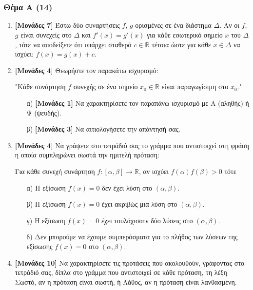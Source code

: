 \documentclass[14pt]{extarticle}
\begin{document}
\part*{}
\section*{Θέμα Α (14)}
  \noindent
  \begin{enumerate}
    \item \textbf{[Μονάδες 7]} Έστω δύο συναρτήσεις $f$, $g$ ορισμένες σε ένα διάστημα $Δ$. Αν οι $f$, $g$ είναι συνεχείς στο $Δ$ και $f'(x)=g'(x)$ για κάθε εσωτερικό σημείο $x$ του $Δ$, τότε να αποδείξετε ότι υπάρχει σταθερά $c\in \mathbb{R}$ τέτοια ώστε για κάθε $x\in Δ$ να ισχύει: $f(x)=g(x)+c$.
    \item \textbf{[Μονάδες 4]} Θεωρήστε τον παρακάτω ισχυρισμό:
      \begin{center}
        "Κάθε συνάρτηση $f$ συνεχής σε ένα σημείο $x_0\in \mathbb{R}$ είναι παραγωγίσιμη στο $x_0$."
      \end{center}
      \begin{enumerate}
        \item [α)] \textbf{[Μονάδες 1]} Να χαρακτηρίσετε τον παραπάνω ισχυρισμό με Α (αληθής) ή Ψ (ψευδής).
        \item [β)] \textbf{[Μονάδες 3]} Να αιτιολογήσετε την απάντησή σας.
      \end{enumerate}
    \item \textbf{[Μονάδες 4]}  Να γράψετε στο τετράδιό σας το γράμμα που αντιστοιχεί στη φράση η οποία συμπληρώνει σωστά την ημιτελή πρόταση:
      \begin{flushleft}
        Για κάθε συνεχή συνάρτηση $f:[α,β]\to \mathbb{R}$, αν ισχύει $f(α)f(β)>0$ τότε
      \end{flushleft}
      \begin{enumerate}
        \item [α)] Η εξίσωση $f(x)=0$ δεν έχει λύση στο $(α,β)$.
        \item [β)] Η εξίσωση $f(x)=0$ έχει ακριβώς μια λύση στο $(α,β)$.
        \item [γ)] Η εξίσωση $f(x)=0$ έχει τουλάχισοτν δύο λύσεις στο $(α,β)$.
        \item [δ)] Δεν μπορούμε να έχουμε συμπεράσματα για το πλήθος των λύσεων της εξίσωσης $f(x)=0$ στο $(α,β)$.
      \end{enumerate}
    \item \textbf{[Μονάδες 10]} Να χαρακτηρίσετε τις προτάσεις που ακολουθούν, γράφοντας στο τετράδιό σας, δίπλα στο γράμμα που αντιστοιχεί σε κάθε πρόταση, τη λέξη Σωστό, αν η πρόταση είναι σωστή, ή Λάθος, αν η πρόταση είναι λανθασμένη.

\end{enumerate}
\end{document}
